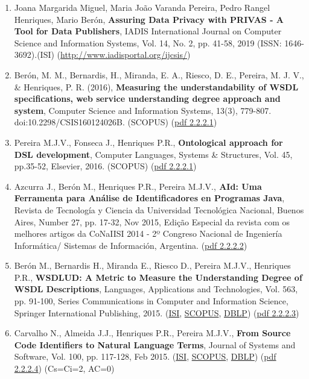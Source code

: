 \documentclass[11pt]{article}
\begin{document}
\begin{enumerate}
\item{ Joana Margarida Miguel, Maria João Varanda Pereira, Pedro Rangel Henriques, Mario Berón, {\bf{ {Assuring Data Privacy with PRIVAS - A Tool for Data Publishers}}}, IADIS International Journal on Computer Science and Information Systems, Vol. 14, No. 2, pp. 41-58, 2019 (ISSN: 1646-3692).(ISI) (\url{http://www.iadisportal.org/ijcsis/})}
\item{ Berón, M. M., Bernardis, H., Miranda, E. A., Riesco, D. E., Pereira, M. J. V., & Henriques, P. R. (2016), {\bf{ {Measuring the understandability of WSDL specifications, web service understanding degree approach and system}}}, Computer Science and Information Systems, 13(3), 779-807. doi:10.2298/CSIS160124026B. (SCOPUS) (\href{run:Publicacoes/publicacoes/93.pdf}{pdf 2.2.2.1})}
\item{ Pereira M.J.V., Fonseca J., Henriques P.R., {\bf{ Ontological approach for DSL development}}, Computer Languages, Systems \& Structures, Vol. 45, pp.35-52, Elsevier, 2016. (SCOPUS) (\href{run:Publicacoes/publicacoes/85.pdf}{pdf 2.2.2.1})}
\item{ Azcurra J., Berón M., Henriques P.R., Pereira M.J.V.,{\bf{ AId: Uma Ferramenta para Análise de Identificadores en Programas Java}}, Revista de Tecnología y Ciencia da Universidad Tecnológica Nacional, Buenos Aires, Number 27, pp. 17-32, Nov 2015, Edição Especial da revista com os melhores artigos da CoNaIISI 2014 - 2º Congreso Nacional de Ingeniería Informática/ Sistemas de Información, Argentina. (\href{run:Publicacoes/publicacoes/86.pdf}{pdf 2.2.2.2}) }
\item{ Berón M., Bernardis H., Miranda E., Riesco D., Pereira M.J.V., Henriques P.R., {\bf{ WSDLUD: A Metric to Measure the Understanding Degree of WSDL Descriptions}}, Languages, Applications and Technologies, Vol. 563, pp. 91-100, Series Communications in Computer and Information Science, Springer International Publishing, 2015. (\href{run:Publicacoes/ComprovativosISI.pdf}{ISI}, \href{run:Publicacoes/PublicacoesSCOPUS.pdf}{SCOPUS}, \href{run:Publicacoes/ComprovativosDBLP.pdf}{DBLP}) (\href{run:Publicacoes/publicacoes/81.pdf}{pdf 2.2.2.3}) }
\item{ Carvalho N., Almeida J.J., Henriques P.R., Pereira M.J.V., {\bf{ From Source Code Identifiers to Natural Language Terms}}, Journal of Systems and Software, Vol. 100, pp. 117-128, Feb 2015. (\href{run:Publicacoes/ComprovativosISI.pdf}{ISI}, \href{run:Publicacoes/PublicacoesSCOPUS.pdf}{SCOPUS}, \href{run:Publicacoes/ComprovativosDBLP.pdf}{DBLP}) (\href{run:Publicacoes/publicacoes/79.pdf}{pdf 2.2.2.4}) (Cs=Ci=2, AC=0)}

\end{enumerate}
\end{document}
